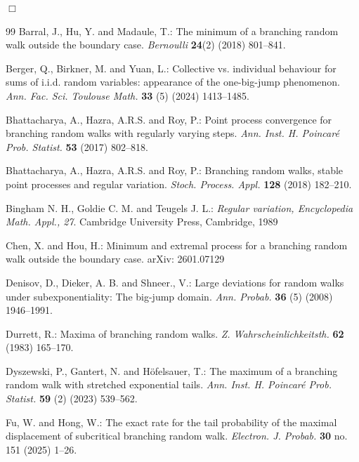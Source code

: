 \documentclass[11pt]{article}
\numberwithin{equation}{section}
\begin{document}
\hfill$\Box$



\bigskip
\noindent

	
	
	\begin{singlespace}
		\small
		\begin{thebibliography}{99}
			 Barral, J., Hu, Y. and Madaule, T.: The minimum of a branching random walk outside the boundary case. \emph{Bernoulli} \textbf{24}(2) (2018) 801--841.
			
			 Berger, Q., Birkner, M. and Yuan, L.:
			Collective vs. individual behaviour for sums of i.i.d. random variables: appearance of the one-big-jump phenomenon. 
			\emph{Ann. Fac. Sci. Toulouse Math.}  \textbf{33} (5) (2024) 1413--1485.
			
			Bhattacharya, A., Hazra, A.R.S. and Roy, P.:
			Point process convergence for branching random
			walks with regularly varying steps. \emph{Ann. Inst. H. Poincar\'e Prob. Statist.} \textbf{53} (2017) 802--818.
			
			Bhattacharya, A., Hazra, A.R.S. and Roy, P.:
			Branching random walks, stable point processes
			and regular variation. \emph{Stoch. Process. Appl.} \textbf{128} (2018) 182--210.
			
			 Bingham N. H., Goldie C. M. and Teugels J. L.: \emph{Regular variation, Encyclopedia Math. Appl., 27}.
			Cambridge University Press, Cambridge, 1989
			
			Chen, X. and Hou, H.: Minimum and extremal process for a branching random walk outside the boundary case. arXiv: 2601.07129
			
			
			 Denisov, D.,  Dieker, A. B. and  Shneer., V.: Large deviations for random walks under subexponentiality: The big-jump domain. \emph{Ann. Probab.} \textbf{36} (5)
			(2008) 1946--1991.
			
			Durrett, R.: Maxima of branching random walks. \emph{Z. Wahrscheinlichkeitsth.} \textbf{62} (1983) 165--170.
			
			Dyszewski, P., Gantert, N. and H\"ofelsauer, T.: The maximum of a branching random walk with
			stretched exponential tails. \emph{Ann. Inst. H. Poincar\'e Prob. Statist.} \textbf{59} (2) (2023) 539--562.
			
			 Fu, W. and Hong, W.:
			The exact rate for the tail probability of the maximal displacement of subcritical branching random walk.
			\emph{Electron. J. Probab.} \textbf{30} no. 151 (2025) 1--26.
			

\end{thebibliography}
\end{singlespace}
\end{document}
